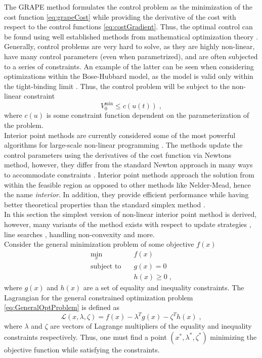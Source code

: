 The GRAPE method formulates the control problem as the minimization of the cost function \eqref{eq:grapeCost} while providing the derivative of the cost with respect to the control functions \eqref{eq:costGradient}. Thus, the optimal control can be found using well established methods from mathematical optimization theory \cite{deFouquieres2011}. Generally, control problems are very hard to solve, as they are highly non-linear, have many control parameters (even when parametrized), and are often subjected to a series of constraints. An example of the latter can be seen when considering optimizations within the Bose-Hubbard model, as the model is valid only within the tight-binding limit \cite{manybodyBloch}. Thus, the control problem will be subject to the non-linear constraint
\begin{equation}
	 V_{0}^{\mathrm{min}} \leq c (u(t))\; ,
\end{equation}
where $c (u)$ is some constraint function dependent on the parameterization of the problem.\\
Interior point methods are currently considered some of the most powerful algorithms for large-scale non-linear programming \cite{wright}. The methods update the control parameters using the derivatives of the cost function via Newtons method, however, they differ from the standard Newton approach in many ways to accommodate constraints \cite{Karmarkar1984,Wachter2006}. Interior point methods approach the solution from within the feasible region as opposed to other methods like Nelder-Mead, hence the name \textit{interior}. In addition, they provide efficient performance while having better theoretical properties than the standard simplex method \cite{wright}.\\

In this section the simplest version of non-linear interior point method is derived, however, many variants of the method exists with respect to update strategies \cite{Byrd1997,Fiacco1990}, line searches \cite{Waltz2006,Wachter2005,Fletcher2002}, handling non-convexity \cite{Vanderbei1999} and more.\\
Consider the general minimization problem of some objective $f(x)$
\begin{subequations}	
 \begin{align}
	\min_{x } 			\quad & f(x) 			\\
	\text{subject to} 	\quad & g(x) = 0  		\\ 
						   	  & h(x) \geq 0 	\; ,
\end{align}
\label{eq:GeneralOptProblem}
\end{subequations}
where $g(x)$ and $h(x)$ are a set of equality and inequality constraints. The Lagrangian for the general constrained optimization problem \eqref{eq:GeneralOptProblem} is defined as
\begin{equation}
	\mathcal{L}(x,\lambda,\zeta) = f(x) - \lambda^T g(x) - \zeta^T h(x)  \; ,
\end{equation}
where $\lambda$ and $\zeta$ are vectors of Lagrange multipliers of the equality and inequality constraints respectively. Thus, one must find a point $(x^*,\lambda^*,\zeta^*)$ minimizing the objective function while satisfying the constraints.

